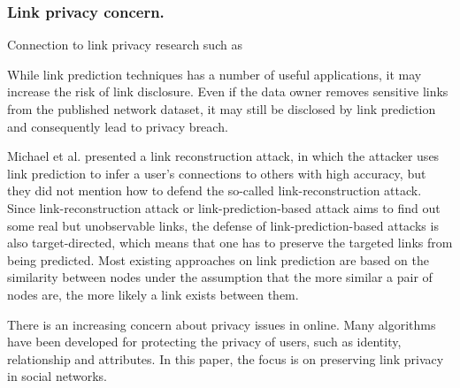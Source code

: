 \subsubsection{Link privacy concern.}

Connection to link privacy research such as \cite{amin:wwwj}

While link prediction techniques has a number of useful applications, it may increase the risk of link disclosure. Even if the data owner removes sensitive links from the published network dataset, it may still be disclosed by link prediction and consequently lead to privacy breach. 

Michael et al. \cite{fire2013links} presented a link reconstruction attack, in which the attacker uses link prediction to infer a user's connections to others with high accuracy, but they did not mention how to defend the so-called link-reconstruction attack. Since link-reconstruction attack or link-prediction-based attack aims to find out some real but unobservable links, the defense of link-prediction-based attacks is also target-directed, which means that one has to preserve the targeted links from being predicted. Most existing approaches on link prediction are based on the similarity between nodes under the assumption that the more similar a pair of nodes are, the more likely a link exists between them.

There is an increasing concern about privacy issues in online. Many algorithms have been developed for protecting the privacy of users, such as identity, relationship and attributes. In this paper, the focus is on preserving link privacy in social networks.


